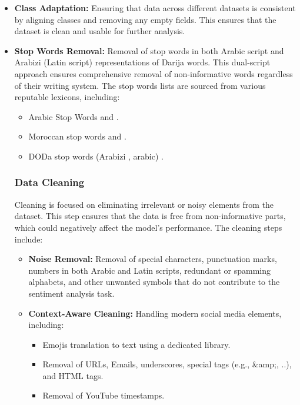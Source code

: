 \documentclass[a4paper,40pt,twocolumn]{article}
\begin{document}
\begin{itemize}
    \item \textbf{Class Adaptation:} Ensuring that data across different datasets is consistent by aligning classes and removing any empty fields. This ensures that the dataset is clean and usable for further analysis.
    
    \item \textbf{Stop Words Removal:} Removal of stop words in both Arabic script and Arabizi (Latin script) representations of Darija words. This dual-script approach ensures comprehensive removal of non-informative words regardless of their writing system. The stop words lists are sourced from various reputable lexicons, including:
    \begin{itemize}
        \item Arabic Stop Words \cite{stop1} and \cite{stop2} .
        \item Moroccan stop words \cite{stop3} and  \cite{stop4} .
        \item DODa stop words (Arabizi , arabic)\cite{stop5} .
\end{itemize}

\subsubsection{Data Cleaning}
Cleaning is focused on eliminating irrelevant or noisy elements from the dataset. This step ensures that the data is free from non-informative parts, which could negatively affect the model's performance. The cleaning steps include:

\begin{itemize}
    \item \textbf{Noise Removal:} Removal of special characters, punctuation marks, numbers in both Arabic and Latin scripts, redundant or spamming alphabets, and other unwanted symbols that do not contribute to the sentiment analysis task.
    \item \textbf{Context-Aware Cleaning:} Handling modern social media elements, including:
    \begin{itemize}
        \item Emojis translation to text using a dedicated library.
        \item Removal of URLs, Emails, underscores, special tags (e.g., \&amp;, ..), and HTML tags.
        \item Removal of YouTube timestamps.
    \end{itemize}
\end{itemize}


\end{itemize}
\end{document}
